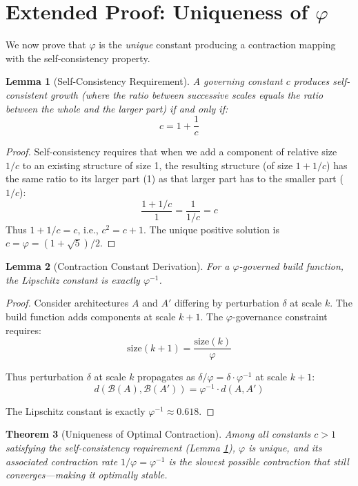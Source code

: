 \documentclass[12pt]{article}
\newtheorem{theorem}{Theorem}
\newtheorem{lemma}[theorem]{Lemma}
\newcommand{\PHI}{\varphi}
\newcommand{\PHIINV}{\varphi^{-1}}
\newcommand{\Build}{\mathcal{B}}
\begin{document}
\section{Extended Proof: Uniqueness of $\PHI$}

We now prove that $\PHI$ is the \emph{unique} constant producing a contraction mapping with the self-consistency property.

\begin{lemma}[Self-Consistency Requirement]
\label{lem:selfconsist}
A governing constant $c$ produces self-consistent growth (where the ratio between successive scales equals the ratio between the whole and the larger part) if and only if:
\[
c = 1 + \frac{1}{c}
\]
\end{lemma}

\begin{proof}
Self-consistency requires that when we add a component of relative size $1/c$ to an existing structure of size 1, the resulting structure (of size $1 + 1/c$) has the same ratio to its larger part (1) as that larger part has to the smaller part ($1/c$):
\[
\frac{1 + 1/c}{1} = \frac{1}{1/c} = c
\]
Thus $1 + 1/c = c$, i.e., $c^2 = c + 1$. The unique positive solution is $c = \PHI = (1 + \sqrt{5})/2$.
\end{proof}

\begin{lemma}[Contraction Constant Derivation]
\label{lem:contraction}
For a $\PHI$-governed build function, the Lipschitz constant is exactly $\PHIINV$.
\end{lemma}

\begin{proof}
Consider architectures $A$ and $A'$ differing by perturbation $\delta$ at scale $k$. The build function adds components at scale $k+1$. The $\PHI$-governance constraint requires:
\[
\text{size}(k+1) = \frac{\text{size}(k)}{\PHI}
\]

Thus perturbation $\delta$ at scale $k$ propagates as $\delta/\PHI = \delta \cdot \PHIINV$ at scale $k+1$:
\[
d(\Build(A), \Build(A')) = \PHIINV \cdot d(A, A')
\]

The Lipschitz constant is exactly $\PHIINV \approx 0.618$.
\end{proof}

\begin{theorem}[Uniqueness of Optimal Contraction]
\label{thm:unique}
Among all constants $c > 1$ satisfying the self-consistency requirement (Lemma \ref{lem:selfconsist}), $\PHI$ is unique, and its associated contraction rate $1/\PHI = \PHIINV$ is the \emph{slowest possible} contraction that still converges—making it optimally stable.
\end{theorem}
\end{document}
